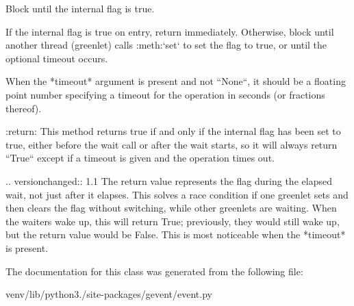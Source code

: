 \begin{DoxyVerb}Block until the internal flag is true.

If the internal flag is true on entry, return immediately. Otherwise,
block until another thread (greenlet) calls :meth:`set` to set the flag to true,
or until the optional timeout occurs.

When the *timeout* argument is present and not ``None``, it should be a
floating point number specifying a timeout for the operation in seconds
(or fractions thereof).

:return: This method returns true if and only if the internal flag has been set to
    true, either before the wait call or after the wait starts, so it will
    always return ``True`` except if a timeout is given and the operation
    times out.

.. versionchanged:: 1.1
    The return value represents the flag during the elapsed wait, not
    just after it elapses. This solves a race condition if one greenlet
    sets and then clears the flag without switching, while other greenlets
    are waiting. When the waiters wake up, this will return True; previously,
    they would still wake up, but the return value would be False. This is most
    noticeable when the *timeout* is present.
\end{DoxyVerb}
 

The documentation for this class was generated from the following file\+:\begin{DoxyCompactItemize}
\item 
venv/lib/python3./site-\/packages/gevent/event.\+py\end{DoxyCompactItemize}
